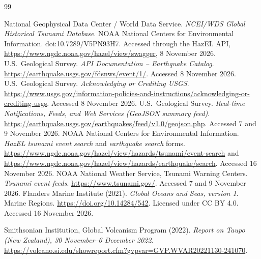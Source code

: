 \documentclass[a4paper,11pt,oneside]{book}
\begin{document}
\setlength{\bibsep}{0pt}
\begin{thebibliography}{99}
\small
\raggedright
{} National Geophysical Data Center / World Data Service. \emph{NCEI/WDS Global Historical Tsunami Database}. NOAA National Centers for Environmental Information. doi:10.7289/V5PN93H7. Accessed through the HazEL API, \url{https://www.ngdc.noaa.gov/hazel/view/swagger}, 8 November 2026.
 U.S.\ Geological Survey. \emph{API Documentation -- Earthquake Catalog}. \url{https://earthquake.usgs.gov/fdsnws/event/1/}. Accessed 8 November 2026.
 U.S.\ Geological Survey. \emph{Acknowledging or Crediting USGS}. \url{https://www.usgs.gov/information-policies-and-instructions/acknowledging-or-crediting-usgs}. Accessed 8 November 2026.
 U.S.\ Geological Survey. \emph{Real-time Notifications, Feeds, and Web Services (GeoJSON summary feed)}. \url{https://earthquake.usgs.gov/earthquakes/feed/v1.0/geojson.php}. Accessed 7 and 9 November 2026.
 NOAA National Centers for Environmental Information. \emph{HazEL tsunami event search} and \emph{earthquake search} forms. \url{https://www.ngdc.noaa.gov/hazel/view/hazards/tsunami/event-search} and \url{https://www.ngdc.noaa.gov/hazel/view/hazards/earthquake/search}. Accessed 16 November 2026.
 NOAA National Weather Service, Tsunami Warning Centers. \emph{Tsunami event feeds}. \url{https://www.tsunami.gov/}. Accessed 7 and 9 November 2026.
Flanders Marine Institute (2021).
\emph{Global Oceans and Seas, version 1}.
Marine Regions.
\url{https://doi.org/10.14284/542}.
Licensed under CC BY 4.0.
Accessed 16 November 2026.

Smithsonian Institution, Global Volcanism Program (2022).
\emph{Report on Taupo (New Zealand),
30 November--6 December 2022}.
\url{https://volcano.si.edu/showreport.cfm?gvpvar=GVP.WVAR20221130-241070}.


\end{thebibliography}
\end{document}
